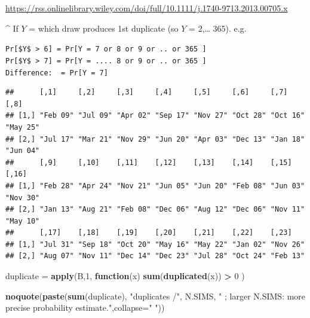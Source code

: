 \documentclass[]{book}
\newenvironment{Shaded}{\begin{snugshade}}{\end{snugshade}}
\newcommand{\CommentTok}[1]{\textcolor[rgb]{0.56,0.35,0.01}{\textit{#1}}}
\newcommand{\ControlFlowTok}[1]{\textcolor[rgb]{0.13,0.29,0.53}{\textbf{#1}}}
\newcommand{\DataTypeTok}[1]{\textcolor[rgb]{0.13,0.29,0.53}{#1}}
\newcommand{\DecValTok}[1]{\textcolor[rgb]{0.00,0.00,0.81}{#1}}
\newcommand{\KeywordTok}[1]{\textcolor[rgb]{0.13,0.29,0.53}{\textbf{#1}}}
\newcommand{\NormalTok}[1]{#1}
\newcommand{\OperatorTok}[1]{\textcolor[rgb]{0.81,0.36,0.00}{\textbf{#1}}}
\newcommand{\OtherTok}[1]{\textcolor[rgb]{0.56,0.35,0.01}{#1}}
\newcommand{\StringTok}[1]{\textcolor[rgb]{0.31,0.60,0.02}{#1}}
\begin{document}
\url{https://rss.onlinelibrary.wiley.com/doi/full/10.1111/j.1740-9713.2013.00705.x}

\^{} If \(Y\) = which draw produces 1st duplicate (so \(Y\) = 2,\ldots{} 365). e.g.

\texttt{Pr{[}\$Y\$\ \textgreater{}\ 6{]}\ =\ Pr{[}Y\ =\ 7\ or\ 8\ or\ 9\ or\ ..\ or\ 365\ {]}}\\
\texttt{Pr{[}\$Y\$\ \textgreater{}\ 7{]}\ =\ Pr{[}Y\ =\ ....\ 8\ or\ 9\ or\ ..\ or\ 365\ {]}}~\\
\texttt{Difference:\ \ =\ Pr{[}Y\ =\ 7{]}}

\begin{Shaded}
\end{Shaded}

\begin{verbatim}
##      [,1]     [,2]     [,3]     [,4]     [,5]     [,6]     [,7]     [,8]    
## [1,] "Feb 09" "Jul 09" "Apr 02" "Sep 17" "Nov 27" "Oct 28" "Oct 16" "May 25"
## [2,] "Jul 17" "Mar 21" "Nov 29" "Jun 20" "Apr 03" "Dec 13" "Jan 18" "Jun 04"
##      [,9]     [,10]    [,11]    [,12]    [,13]    [,14]    [,15]    [,16]   
## [1,] "Feb 28" "Apr 24" "Nov 21" "Jun 05" "Jun 20" "Feb 08" "Jun 03" "Nov 30"
## [2,] "Jan 13" "Aug 21" "Feb 08" "Dec 06" "Aug 12" "Dec 06" "Nov 11" "May 10"
##      [,17]    [,18]    [,19]    [,20]    [,21]    [,22]    [,23]   
## [1,] "Jul 31" "Sep 18" "Oct 20" "May 16" "May 22" "Jan 02" "Nov 26"
## [2,] "Aug 07" "Nov 11" "Dec 14" "Dec 23" "Jul 28" "Oct 24" "Feb 13"
\end{verbatim}

\begin{Shaded}
\begin{Highlighting}[]
\NormalTok{duplicate =}\StringTok{ }\KeywordTok{apply}\NormalTok{(B,}\DecValTok{1}\NormalTok{,}
   \ControlFlowTok{function}\NormalTok{(x) }\KeywordTok{sum}\NormalTok{(}\KeywordTok{duplicated}\NormalTok{(x)) }\OperatorTok{>}\StringTok{ }\DecValTok{0}\NormalTok{ )}

\KeywordTok{noquote}\NormalTok{(}\KeywordTok{paste}\NormalTok{(}\KeywordTok{sum}\NormalTok{(duplicate), }\StringTok{"duplicates /"}\NormalTok{, }
\NormalTok{   N.SIMS,}
   \StringTok{" ; larger N.SIMS: more precise probability estimate."}\NormalTok{,}\DataTypeTok{collapse=}\StringTok{" "}\NormalTok{))}
\end{Highlighting}
\end{Shaded}
\end{document}
